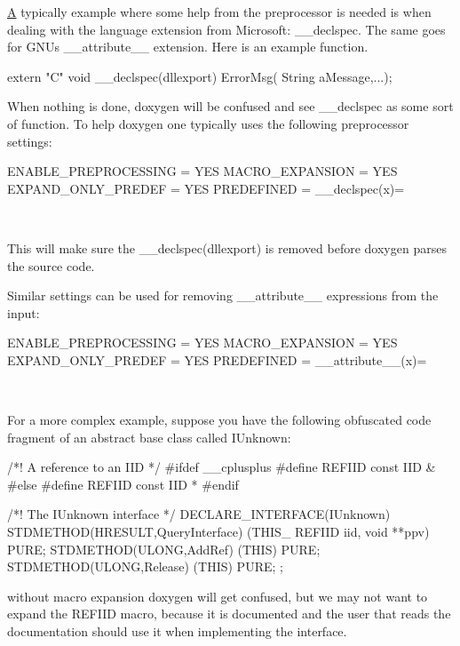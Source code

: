 \mbox{\hyperlink{class_a}{A}} typically example where some help from the preprocessor is needed is when dealing with the language extension from Microsoft\+: {\ttfamily \+\_\+\+\_\+declspec}. The same goes for G\+NU\textquotesingle{}s {\ttfamily \+\_\+\+\_\+attribute\+\_\+\+\_\+} extension. Here is an example function.

\begin{DoxyVerb}extern "C" void __declspec(dllexport) ErrorMsg( String aMessage,...);
\end{DoxyVerb}


When nothing is done, doxygen will be confused and see {\ttfamily \+\_\+\+\_\+declspec} as some sort of function. To help doxygen one typically uses the following preprocessor settings\+:

\begin{DoxyVerb}ENABLE_PREPROCESSING   = YES
MACRO_EXPANSION        = YES
EXPAND_ONLY_PREDEF     = YES
PREDEFINED             = __declspec(x)=
\end{DoxyVerb}
 ~\newline


This will make sure the {\ttfamily \+\_\+\+\_\+declspec(dllexport)} is removed before doxygen parses the source code.

Similar settings can be used for removing {\ttfamily \+\_\+\+\_\+attribute\+\_\+\+\_\+} expressions from the input\+:

\begin{DoxyVerb}ENABLE_PREPROCESSING   = YES
MACRO_EXPANSION        = YES
EXPAND_ONLY_PREDEF     = YES
PREDEFINED             = __attribute__(x)=
\end{DoxyVerb}
 ~\newline


For a more complex example, suppose you have the following obfuscated code fragment of an abstract base class called {\ttfamily I\+Unknown\+:} 

\begin{DoxyVerb}/*! A reference to an IID */
#ifdef __cplusplus
#define REFIID const IID &
#else
#define REFIID const IID *
#endif


/*! The IUnknown interface */
DECLARE_INTERFACE(IUnknown)
{
  STDMETHOD(HRESULT,QueryInterface) (THIS_ REFIID iid, void **ppv) PURE;
  STDMETHOD(ULONG,AddRef) (THIS) PURE;
  STDMETHOD(ULONG,Release) (THIS) PURE;
};
\end{DoxyVerb}


without macro expansion doxygen will get confused, but we may not want to expand the {\ttfamily R\+E\+F\+I\+ID} macro, because it is documented and the user that reads the documentation should use it when implementing the interface.

